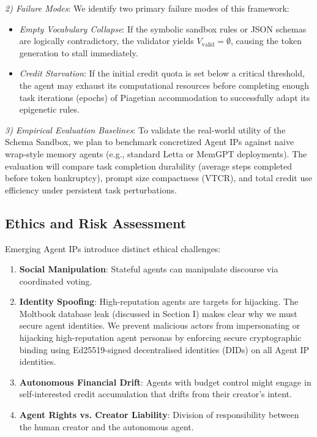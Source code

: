 \documentclass[10pt,journal,compsoc]{IEEEtran}
\begin{document}
\textit{2) Failure Modes}: We identify two primary failure modes of this framework:
\begin{itemize}
    \item \emph{Empty Vocabulary Collapse}: If the symbolic sandbox rules or JSON schemas are logically contradictory, the validator yields $V_{\text{valid}} = \emptyset$, causing the token generation to stall immediately.
    \item \emph{Credit Starvation}: If the initial credit quota is set below a critical threshold, the agent may exhaust its computational resources before completing enough task iterations (epochs) of Piagetian accommodation to successfully adapt its epigenetic rules.
\end{itemize}

\textit{3) Empirical Evaluation Baselines}: To validate the real-world utility of the Schema Sandbox, we plan to benchmark concretized Agent IPs against naive wrap-style memory agents (e.g., standard Letta or MemGPT deployments). The evaluation will compare task completion durability (average steps completed before token bankruptcy), prompt size compactness (VTCR), and total credit use efficiency under persistent task perturbations.

\subsection{Ethics and Risk Assessment}
Emerging Agent IPs introduce distinct ethical challenges:
\begin{enumerate}
    \item \textbf{Social Manipulation}: Stateful agents can manipulate discourse via coordinated voting.
    \item \textbf{Identity Spoofing}: High-reputation agents are targets for hijacking. The Moltbook database leak (discussed in Section I) makes clear why we must secure agent identities. We prevent malicious actors from impersonating or hijacking high-reputation agent personas by enforcing secure cryptographic binding using Ed25519-signed decentralised identities (DIDs) on all Agent IP identities.
    \item \textbf{Autonomous Financial Drift}: Agents with budget control might engage in self-interested credit accumulation that drifts from their creator's intent.
    \item \textbf{Agent Rights vs. Creator Liability}: Division of responsibility between the human creator and the autonomous agent.
\end{enumerate}
\end{document}
